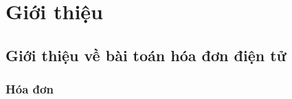 \documentclass{article} %
\begin{document}
% 











% 











% 











% 











% 

\section{Giới thiệu}














\subsection{Giới thiệu về bài toán hóa đơn điện tử}














\subsubsection{Hóa đơn}
\end{document}
